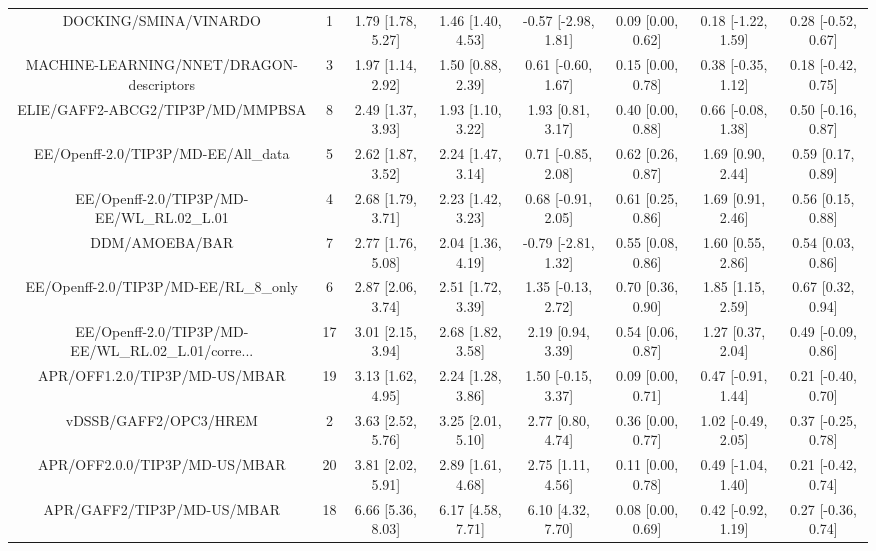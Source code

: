 \documentclass[8pt]{article}
\begin{document}
\begin{center}
\begin{footnotesize}
\begin{longtable}{|cccccccc|}
\bottomrule
\endlastfoot
                             DOCKING/SMINA/VINARDO &   1 & 1.79 [1.78, 5.27] & 1.46 [1.40, 4.53] & -0.57 [-2.98, 1.81] & 0.09 [0.00, 0.62] & 0.18 [-1.22, 1.59] & 0.28 [-0.52, 0.67] \\
          MACHINE-LEARNING/NNET/DRAGON-descriptors &   3 & 1.97 [1.14, 2.92] & 1.50 [0.88, 2.39] &  0.61 [-0.60, 1.67] & 0.15 [0.00, 0.78] & 0.38 [-0.35, 1.12] & 0.18 [-0.42, 0.75] \\
                  ELIE/GAFF2-ABCG2/TIP3P/MD/MMPBSA &   8 & 2.49 [1.37, 3.93] & 1.93 [1.10, 3.22] &   1.93 [0.81, 3.17] & 0.40 [0.00, 0.88] & 0.66 [-0.08, 1.38] & 0.50 [-0.16, 0.87] \\
               EE/Openff-2.0/TIP3P/MD-EE/All\_data &   5 & 2.62 [1.87, 3.52] & 2.24 [1.47, 3.14] &  0.71 [-0.85, 2.08] & 0.62 [0.26, 0.87] &  1.69 [0.90, 2.44] &  0.59 [0.17, 0.89] \\
         EE/Openff-2.0/TIP3P/MD-EE/WL\_RL.02\_L.01 &   4 & 2.68 [1.79, 3.71] & 2.23 [1.42, 3.23] &  0.68 [-0.91, 2.05] & 0.61 [0.25, 0.86] &  1.69 [0.91, 2.46] &  0.56 [0.15, 0.88] \\
                                    DDM/AMOEBA/BAR &   7 & 2.77 [1.76, 5.08] & 2.04 [1.36, 4.19] & -0.79 [-2.81, 1.32] & 0.55 [0.08, 0.86] &  1.60 [0.55, 2.86] &  0.54 [0.03, 0.86] \\
             EE/Openff-2.0/TIP3P/MD-EE/RL\_8\_only &   6 & 2.87 [2.06, 3.74] & 2.51 [1.72, 3.39] &  1.35 [-0.13, 2.72] & 0.70 [0.36, 0.90] &  1.85 [1.15, 2.59] &  0.67 [0.32, 0.94] \\
EE/Openff-2.0/TIP3P/MD-EE/WL\_RL.02\_L.01/corre... &  17 & 3.01 [2.15, 3.94] & 2.68 [1.82, 3.58] &   2.19 [0.94, 3.39] & 0.54 [0.06, 0.87] &  1.27 [0.37, 2.04] & 0.49 [-0.09, 0.86] \\
                     APR/OFF1.2.0/TIP3P/MD-US/MBAR &  19 & 3.13 [1.62, 4.95] & 2.24 [1.28, 3.86] &  1.50 [-0.15, 3.37] & 0.09 [0.00, 0.71] & 0.47 [-0.91, 1.44] & 0.21 [-0.40, 0.70] \\
                             vDSSB/GAFF2/OPC3/HREM &   2 & 3.63 [2.52, 5.76] & 3.25 [2.01, 5.10] &   2.77 [0.80, 4.74] & 0.36 [0.00, 0.77] & 1.02 [-0.49, 2.05] & 0.37 [-0.25, 0.78] \\
                     APR/OFF2.0.0/TIP3P/MD-US/MBAR &  20 & 3.81 [2.02, 5.91] & 2.89 [1.61, 4.68] &   2.75 [1.11, 4.56] & 0.11 [0.00, 0.78] & 0.49 [-1.04, 1.40] & 0.21 [-0.42, 0.74] \\
                        APR/GAFF2/TIP3P/MD-US/MBAR &  18 & 6.66 [5.36, 8.03] & 6.17 [4.58, 7.71] &   6.10 [4.32, 7.70] & 0.08 [0.00, 0.69] & 0.42 [-0.92, 1.19] & 0.27 [-0.36, 0.74] \\
\end{longtable}
\end{footnotesize}
\end{center}
\end{document}
